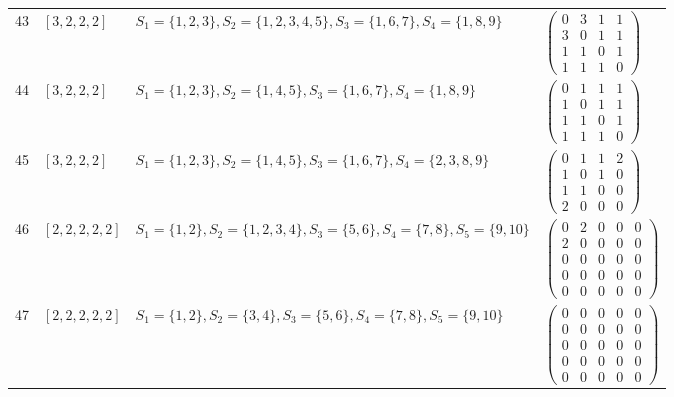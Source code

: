 \begin{longtable}{@{}r>{\raggedright\arraybackslash}p{1.5cm}>{\raggedright\arraybackslash}p{8.4cm}>{\raggedright\arraybackslash}p{4.2cm}@{}}
43 & $[3,2,2,2]$ & $S_{1}=\{1,2,3\}, S_{2}=\{1,2,3,4,5\}, S_{3}=\{1,6,7\}, S_{4}=\{1,8,9\}$ & $\left(\begin{smallmatrix}0 & 3 & 1 & 1\\3 & 0 & 1 & 1\\1 & 1 & 0 & 1\\1 & 1 & 1 & 0\end{smallmatrix}\right)$ \\
44 & $[3,2,2,2]$ & $S_{1}=\{1,2,3\}, S_{2}=\{1,4,5\}, S_{3}=\{1,6,7\}, S_{4}=\{1,8,9\}$ & $\left(\begin{smallmatrix}0 & 1 & 1 & 1\\1 & 0 & 1 & 1\\1 & 1 & 0 & 1\\1 & 1 & 1 & 0\end{smallmatrix}\right)$ \\
45 & $[3,2,2,2]$ & $S_{1}=\{1,2,3\}, S_{2}=\{1,4,5\}, S_{3}=\{1,6,7\}, S_{4}=\{2,3,8,9\}$ & $\left(\begin{smallmatrix}0 & 1 & 1 & 2\\1 & 0 & 1 & 0\\1 & 1 & 0 & 0\\2 & 0 & 0 & 0\end{smallmatrix}\right)$ \\
46 & $[2,2,2,2,2]$ & $S_{1}=\{1,2\}, S_{2}=\{1,2,3,4\}, S_{3}=\{5,6\}, S_{4}=\{7,8\}, S_{5}=\{9,10\}$ & $\left(\begin{smallmatrix}0 & 2 & 0 & 0 & 0\\2 & 0 & 0 & 0 & 0\\0 & 0 & 0 & 0 & 0\\0 & 0 & 0 & 0 & 0\\0 & 0 & 0 & 0 & 0\end{smallmatrix}\right)$ \\
47 & $[2,2,2,2,2]$ & $S_{1}=\{1,2\}, S_{2}=\{3,4\}, S_{3}=\{5,6\}, S_{4}=\{7,8\}, S_{5}=\{9,10\}$ & $\left(\begin{smallmatrix}0 & 0 & 0 & 0 & 0\\0 & 0 & 0 & 0 & 0\\0 & 0 & 0 & 0 & 0\\0 & 0 & 0 & 0 & 0\\0 & 0 & 0 & 0 & 0\end{smallmatrix}\right)$ \\
\end{longtable}
\endgroup